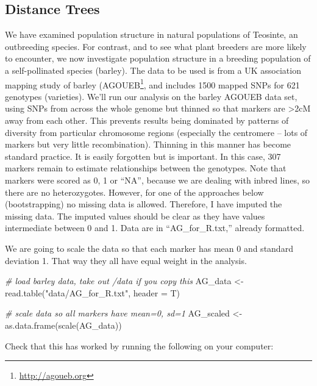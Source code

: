 \documentclass[
]{book}
\newenvironment{Shaded}{\begin{snugshade}}{\end{snugshade}}
\newcommand{\AttributeTok}[1]{\textcolor[rgb]{0.77,0.63,0.00}{#1}}
\newcommand{\CommentTok}[1]{\textcolor[rgb]{0.56,0.35,0.01}{\textit{#1}}}
\newcommand{\FunctionTok}[1]{\textcolor[rgb]{0.00,0.00,0.00}{#1}}
\newcommand{\NormalTok}[1]{#1}
\newcommand{\OtherTok}[1]{\textcolor[rgb]{0.56,0.35,0.01}{#1}}
\newcommand{\StringTok}[1]{\textcolor[rgb]{0.31,0.60,0.02}{#1}}
\renewcommand{\href}[2]{#2\footnote{\url{#1}}}
\begin{document}
\hypertarget{distance-trees}{%
\subsection{Distance Trees}\label{distance-trees}}

We have examined population structure in natural populations of Teosinte, an outbreeding species. For contrast, and to see what plant breeders are more likely to encounter, we now investigate population structure in a breeding population of a self-pollinated species (barley). The data to be used is from a UK association mapping study of barley (\href{http://agoueb.org}{AGOUEB}, and includes 1500 mapped SNPs for 621 genotypes (varieties). We'll run our analysis on the barley AGOUEB data set, using SNPs from across the whole genome but thinned so that markers are \textgreater2cM away from each other. This prevents results being dominated by patterns of diversity from particular chromosome regions (especially the centromere -- lots of markers but very little recombination). Thinning in this manner has become standard practice. It is easily forgotten but is important. In this case, 307 markers remain to estimate relationships between the genotypes. Note that markers were scored as 0, 1 or ``NA'', because we are dealing with inbred lines, so there are no heterozygotes. However, for one of the approaches below (bootstrapping) no missing data is allowed. Therefore, I have imputed the missing data. The imputed values should be clear as they have values intermediate between 0 and 1. Data are in ``AG\_for\_R.txt,'' already formatted.

We are going to scale the data so that each marker has mean 0 and standard deviation 1. That way they all have equal weight in the analysis.

\begin{Shaded}
\begin{Highlighting}[]
\CommentTok{\# load barley data, take out /data if you copy this}
\NormalTok{AG\_data }\OtherTok{\textless{}{-}} \FunctionTok{read.table}\NormalTok{(}\StringTok{"data/AG\_for\_R.txt"}\NormalTok{, }\AttributeTok{header =}\NormalTok{ T)}

\CommentTok{\# scale data so all markers have mean=0, sd=1}
\NormalTok{AG\_scaled }\OtherTok{\textless{}{-}} \FunctionTok{as.data.frame}\NormalTok{(}\FunctionTok{scale}\NormalTok{(AG\_data))}
\end{Highlighting}
\end{Shaded}

Check that this has worked by running the following on your computer:
\end{document}
